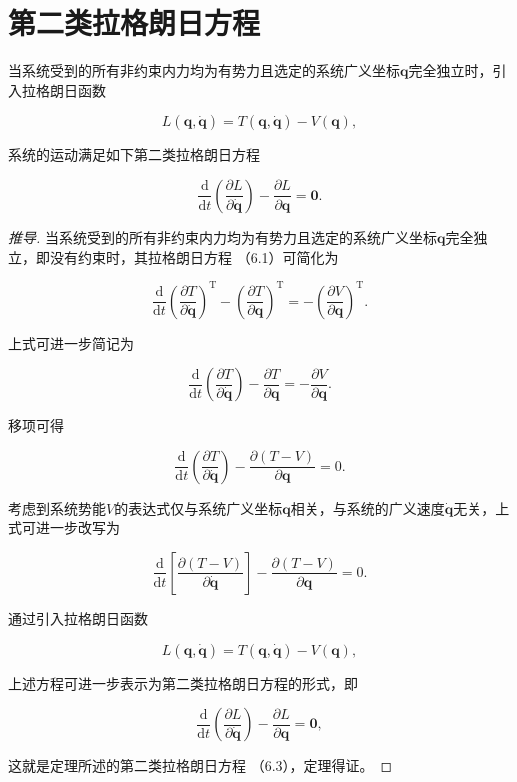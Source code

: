 \section{第二类拉格朗日方程}
\begin{theorem}[第二类拉格朗日方程]
当系统受到的所有非约束内力均为有势力且选定的系统广义坐标$\boldsymbol{q}$完全独立时，引入拉格朗日函数

\[
L(\boldsymbol{q},\dot{\boldsymbol{q}}) = T(\boldsymbol{q},\dot{\boldsymbol{q}}) - V(\boldsymbol{q}),
\]

系统的运动满足如下第二类拉格朗日方程

\[
\frac{\mathrm{d}}{\mathrm{d}t}\left(\frac{\partial L}{\partial \dot{\boldsymbol{q}}}\right) - \frac{\partial L}{\partial \boldsymbol{q}} = \boldsymbol{0}.
\]
\end{theorem}
\begin{proof}[推导]
当系统受到的所有非约束内力均为有势力且选定的系统广义坐标$\boldsymbol{q}$完全独立，即没有约束时，其拉格朗日方程 （6.1）可简化为

\[
\frac{\mathrm{d}}{\mathrm{d}t}\left(\frac{\partial T}{\partial \dot{\boldsymbol{q}}}\right)^{\mathrm{T}} - \left(\frac{\partial T}{\partial \boldsymbol{q}}\right)^{\mathrm{T}} = -\left(\frac{\partial V}{\partial \boldsymbol{q}}\right)^{\mathrm{T}}.
\]

上式可进一步简记为

\[
\frac{\mathrm{d}}{\mathrm{d}t}\left(\frac{\partial T}{\partial \dot{\boldsymbol{q}}}\right) - \frac{\partial T}{\partial \boldsymbol{q}} = -\frac{\partial V}{\partial \boldsymbol{q}}.
\]

移项可得

\[
\frac{\mathrm{d}}{\mathrm{d}t}\left(\frac{\partial T}{\partial \dot{\boldsymbol{q}}}\right) - \frac{\partial(T-V)}{\partial \boldsymbol{q}} = 0.
\]

考虑到系统势能$V$的表达式仅与系统广义坐标$\boldsymbol{q}$相关，与系统的广义速度$\dot{\boldsymbol{q}}$无关，上式可进一步改写为

\[
\frac{\mathrm{d}}{\mathrm{d}t}\left[\frac{\partial(T-V)}{\partial \dot{\boldsymbol{q}}}\right] - \frac{\partial(T-V)}{\partial \boldsymbol{q}} = 0.
\]

通过引入拉格朗日函数

\[
L(\boldsymbol{q},\dot{\boldsymbol{q}}) = T(\boldsymbol{q},\dot{\boldsymbol{q}}) - V(\boldsymbol{q}),
\]

上述方程可进一步表示为第二类拉格朗日方程的形式，即

\[
\frac{\mathrm{d}}{\mathrm{d}t}\left(\frac{\partial L}{\partial \dot{\boldsymbol{q}}}\right) - \frac{\partial L}{\partial \boldsymbol{q}} = \boldsymbol{0},
\]

这就是定理所述的第二类拉格朗日方程 （6.3），定理得证。
\end{proof}
